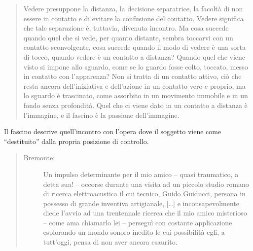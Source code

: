 \begin{quote}
  \begin{sf}
    \small
    Vedere presuppone la distanza, la decisione separatrice, la facoltà di non essere in contatto e di evitare la confusione del contatto. Vedere significa che tale separazione è, tuttavia, divenuta incontro. Ma cosa succede quando quel che si vede, per quanto distante, sembra toccarvi con un contatto sconvolgente, cosa succede quando il modo di vedere è una sorta di tocco, quando vedere è un contatto a distanza? Quando quel che viene visto si impone allo sguardo, come se lo guardo fosse colto, toccato, messo in contatto con l’apparenza? Non si tratta di un contatto attivo, ciò che resta ancora dell’iniziativa e dell’azione in un contatto vero e proprio, ma lo sguardo è trascinato, come assorbito in un movimento immobile e in un fondo senza profondità. Quel che ci viene dato in un contatto a distanza è l’immagine, e il fascino è la passione dell’immagine.
  \end{sf}
\end{quote}

Il fascino descrive quell'incontro con l'opera dove il soggetto viene come
“destituito” dalla propria posizione di controllo.

\begin{quote}
  \begin{sf}
    \small
    \begin{description}
      \item[Bremonte:] %
      Un impulso determinante per il mio amico – quasi traumatico, a detta sua! –
      occorse durante una visita ad un piccolo studio romano di ricerca
      elettroacustica il cui tecnico, Guido Guiducci, persona in possesso di
      grande inventiva artigianale,%
      [\ldots] e inconsapevolmente diede l’avvio ad una trentennale ricerca che il mio
      amico misterioso – come ama chiamarlo lei – perseguì con costante
      applicazione esplorando un mondo sonoro inedito le cui possibilità egli, a
      tutt’oggi, pensa di non aver ancora esaurito.
    \end{description}
  \end{sf}
\end{quote}

